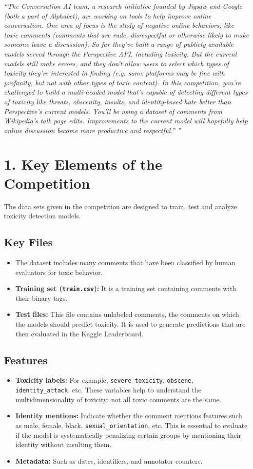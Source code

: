 \documentclass[a4paper,12pt]{article}
\begin{document}
\textit{“The Conversation AI team, a research initiative founded by Jigsaw and Google (both a part of Alphabet), are working on tools to help improve online conversation. One area of focus is the study of negative online behaviors, like toxic comments (comments that are rude, disrespectful or otherwise likely to make someone leave a discussion). So far they’ve built a range of publicly available models served through the Perspective API, including toxicity. But the current models still make errors, and they don’t allow users to select which types of toxicity they’re interested in finding (e.g. some platforms may be fine with profanity, but not with other types of toxic content).
In this competition, you’re challenged to build a multi-headed model that’s capable of detecting different types of toxicity like threats, obscenity, insults, and identity-based hate better than Perspective’s current models. You’ll be using a dataset of comments from Wikipedia’s talk page edits. Improvements to the current model will hopefully help online discussion become more productive and respectful.”
”}

\section*{1. Key Elements of the Competition}
The data sets given in the competition are designed to train, test and analyze toxicity detection models.
\subsection*{Key Files}
\begin{itemize}
 \item The dataset includes many comments that have been classified by human evaluators for toxic behavior.
\item \textbf{Training set (\texttt{train.csv}):} It is a training set containing comments with their binary tags.
    \item \textbf{Test files:} This file contains unlabeled comments, the comments on which the models should predict toxicity. It is used to generate predictions that are then evaluated in the Kaggle Leaderboard.
\end{itemize}
\subsection*{Features}
\begin{itemize}
\item \textbf{Toxicity labels:} For example, \texttt{severe\_toxicity}, \texttt{obscene}, \texttt{identity\_attack}, etc. These variables help to understand the multidimensionality of toxicity: not all toxic comments are the same.
\item \textbf{Identity mentions:} Indicate whether the comment mentions features such as male, female, black, \texttt{sexual\_orientation}, etc. This is essential to evaluate if the model is systematically penalizing certain groups by mentioning their identity without insulting them.
\item \textbf{Metadata:} Such as dates, identifiers, and annotator counters.
\end{itemize}
\end{document}
